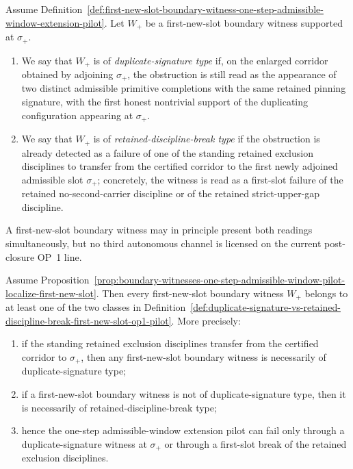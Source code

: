 \begin{definition}
\label{def:duplicate-signature-vs-retained-discipline-break-first-new-slot-op1-pilot}
Assume Definition~\ref{def:first-new-slot-boundary-witness-one-step-admissible-window-extension-pilot}. Let $W_{+}$ be a first-new-slot boundary witness supported at $\sigma_{+}$.
\begin{enumerate}[leftmargin=2em,label=(\roman*)]
 \item We say that $W_{+}$ is of \emph{duplicate-signature type} if, on the enlarged corridor obtained by adjoining $\sigma_{+}$, the obstruction is still read as the appearance of two distinct admissible primitive completions with the same retained pinning signature, with the first honest nontrivial support of the duplicating configuration appearing at $\sigma_{+}$.
 \item We say that $W_{+}$ is of \emph{retained-discipline-break type} if the obstruction is already detected as a failure of one of the standing retained exclusion disciplines to transfer from the certified corridor to the first newly adjoined admissible slot $\sigma_{+}$; concretely, the witness is read as a first-slot failure of the retained no-second-carrier discipline or of the retained strict-upper-gap discipline.
\end{enumerate}
A first-new-slot boundary witness may in principle present both readings simultaneously, but no third autonomous channel is licensed on the current post-closure OP~1 line.
\end{definition}

\begin{proposition}
\label{prop:first-new-slot-boundary-witnesses-split-duplicate-signature-vs-retained-discipline-break}
Assume Proposition~\ref{prop:boundary-witnesses-one-step-admissible-window-pilot-localize-first-new-slot}. Then every first-new-slot boundary witness $W_{+}$ belongs to at least one of the two classes in Definition~\ref{def:duplicate-signature-vs-retained-discipline-break-first-new-slot-op1-pilot}. More precisely:
\begin{enumerate}[leftmargin=2em,label=(\roman*)]
 \item if the standing retained exclusion disciplines transfer from the certified corridor to $\sigma_{+}$, then any first-new-slot boundary witness is necessarily of duplicate-signature type;
 \item if a first-new-slot boundary witness is not of duplicate-signature type, then it is necessarily of retained-discipline-break type;
 \item hence the one-step admissible-window extension pilot can fail only through a duplicate-signature witness at $\sigma_{+}$ or through a first-slot break of the retained exclusion disciplines.
\end{enumerate}
\end{proposition}

